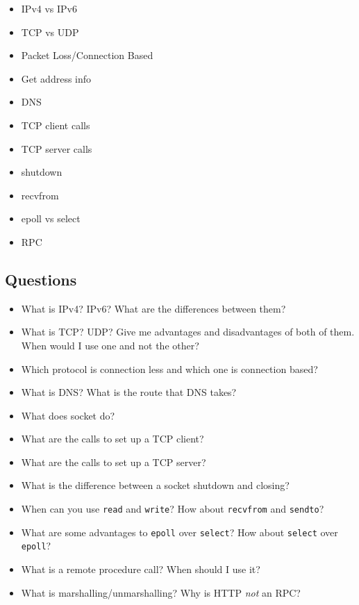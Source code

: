 \documentclass[]{article}
\begin{document}
\begin{itemize}
\item
  IPv4 vs IPv6
\item
  TCP vs UDP
\item
  Packet Loss/Connection Based
\item
  Get address info
\item
  DNS
\item
  TCP client calls
\item
  TCP server calls
\item
  shutdown
\item
  recvfrom
\item
  epoll vs select
\item
  RPC
\end{itemize}

\subsection{Questions}\label{questions}

\begin{itemize}
\item
  What is IPv4? IPv6? What are the differences between them?
\item
  What is TCP? UDP? Give me advantages and disadvantages of both of
  them. When would I use one and not the other?
\item
  Which protocol is connection less and which one is connection based?
\item
  What is DNS? What is the route that DNS takes?
\item
  What does socket do?
\item
  What are the calls to set up a TCP client?
\item
  What are the calls to set up a TCP server?
\item
  What is the difference between a socket shutdown and closing?
\item
  When can you use \texttt{read} and \texttt{write}? How about
  \texttt{recvfrom} and \texttt{sendto}?
\item
  What are some advantages to \texttt{epoll} over \texttt{select}? How
  about \texttt{select} over \texttt{epoll}?
\item
  What is a remote procedure call? When should I use it?
\item
  What is marshalling/unmarshalling? Why is HTTP \emph{not} an RPC?
\end{itemize}
\end{document}
